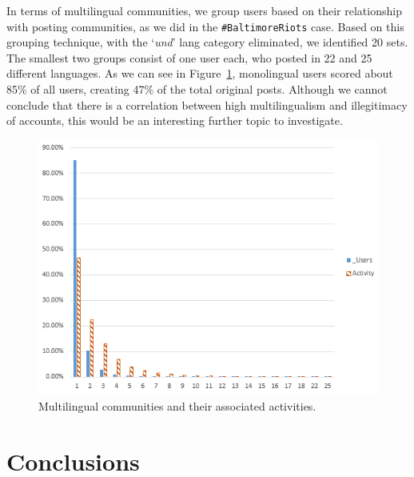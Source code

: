\documentclass{llncs}
\begin{document}
{In terms of multilingual communities, we group users based on their
relationship with posting communities, as we did in the
{\texttt{\#BaltimoreRiots}} case.  Based on this grouping technique,
with the `{\emph{und}}' lang category eliminated, we identified 20
sets. The smallest two groups consist of one user each, who posted in
22 and 25 different languages.  As we can see in
Figure~\ref{fig:multilingual}, monolingual users scored about 85\% of
all users, creating 47\% of the total original posts. Although we
cannot conclude that there is a correlation between high
multilingualism and illegitimacy of accounts, this would be an
interesting further topic to investigate.

\begin{figure}[htb]
\centering
\includegraphics[width=\columnwidth]{images/multilingualcommunities.png}
\caption{Multilingual communities and their associated activities.}
\label{fig:multilingual}
\end{figure}


\section{Conclusions}\label{conclusions}

}
\end{document}
